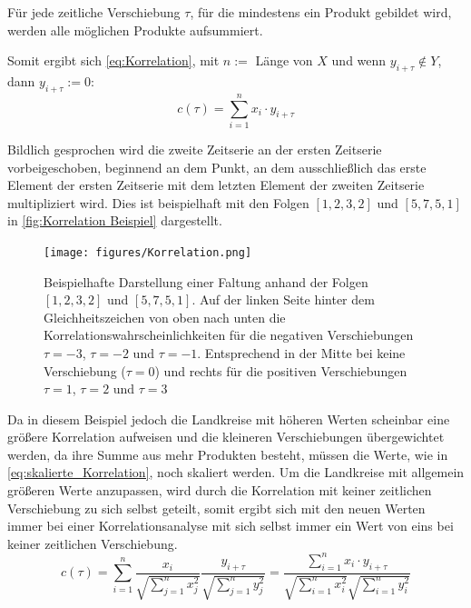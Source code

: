Für jede zeitliche Verschiebung $\tau$, für die mindestens ein Produkt gebildet wird, werden alle möglichen Produkte aufsummiert.

Somit ergibt sich \autoref{eq:Korrelation}, mit $n := $ Länge von $X$ und wenn $y_{i+\tau} \not\in Y$, dann $y_{i+\tau} := 0$:
\begin{equation}\label{eq:Korrelation}
    c(\tau) = \sum_{i=1}^n x_i\cdot y_{i+\tau}
\end{equation}


Bildlich gesprochen wird die zweite Zeitserie an der ersten Zeitserie vorbeigeschoben, beginnend an dem Punkt, an dem ausschließlich das erste Element der ersten Zeitserie mit dem letzten Element der zweiten Zeitserie multipliziert wird. Dies ist beispielhaft mit den Folgen $[1,2,3,2]$ und $[5,7,5,1]$ in \autoref{fig:Korrelation Beispiel} dargestellt.

\begin{figure}[H]
    \centering
    \texttt{[image: figures/Korrelation.png]}
    \caption{Beispielhafte Darstellung einer Faltung anhand der Folgen $[1,2,3,2]$ und $[5,7,5,1]$. Auf der linken Seite hinter dem Gleichheitszeichen von oben nach unten die Korrelationswahrscheinlichkeiten für die negativen Verschiebungen $\tau=-3$, $\tau=-2$ und $\tau=-1$. Entsprechend in der Mitte bei keine Verschiebung ($\tau=0$) und rechts für die positiven Verschiebungen $\tau=1$, $\tau=2$ und $\tau=3$}
    \label{fig:Korrelation Beispiel}
\end{figure}

Da in diesem Beispiel jedoch die Landkreise mit höheren Werten scheinbar eine größere Korrelation aufweisen und die kleineren Verschiebungen übergewichtet werden, da ihre Summe aus mehr Produkten besteht, müssen die Werte, wie in \autoref{eq:skalierte_Korrelation}, noch skaliert werden.
Um die Landkreise mit allgemein größeren Werte anzupassen, wird durch die Korrelation mit keiner zeitlichen Verschiebung zu sich selbst
geteilt, somit ergibt sich mit den neuen Werten immer bei einer Korrelationsanalyse mit sich selbst immer ein Wert von eins bei keiner zeitlichen Verschiebung.
\begin{equation}\label{eq:skalierte_Korrelation}
    c(\tau) =\sum_{i=1}^n \frac{x_i}{\sqrt{\sum_{j=1}^n x_j^2}}
    \frac{y_{i+\tau}}{\sqrt{\sum_{j=1}^n y_j^2}}= 
    \frac{\sum_{i=1}^n x_i\cdot y_{i+\tau}}{\sqrt{\sum_{i=1}^n x_i^2}\sqrt{\sum_{i=1}^n y_i^2}}
\end{equation}

